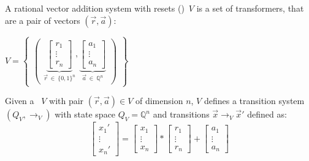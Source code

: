 \begin{frame}[t]
	\frametitle{\qvasr}
	\begin{definition}[\qvasr]
		A rational vector addition system with resets (\qvasr)\ $V$ is a set of transformers, that are a pair of vectors $(\vec{r}, \vec{a})$:\\
		\begin{center}
			$ V = 
			\begin{Bmatrix}
				\begin{pmatrix}
					\underbrace{
						\begin{bmatrix}
							r_1 \\
							\vdots \\
							r_n
					\end{bmatrix}}_{\vec{r}\ \in\ \{0,1\}^n},
					\underbrace{
						\begin{bmatrix}
							a_1 \\
							\vdots \\
							a_n
					\end{bmatrix}}_{\vec{a}\ \in\ \mathbb{Q}^n}
				\end{pmatrix}
			\end{Bmatrix}
			$
		\end{center}
	\end{definition}
	\begin{center}
		Given a \qvasr\ $V$ with pair $(\vec{r}, \vec{a}) \in V$ of dimension $n$, $V$ defines a transition system $(Q_V, \rightarrow_V)$ with state space $Q_V =  \mathbb{Q}^n$  and transitions $\vec{x} \rightarrow_V \vec{x}'$ defined as: \\
			\begin{equation*}
				\begin{bmatrix}
					x_1' \\
					\vdots \\
					x_n'
				\end{bmatrix}
				=
				\begin{bmatrix}
					x_1 \\
					\vdots \\
					x_n
				\end{bmatrix}
				*
				\begin{bmatrix}
					r_1 \\
					\vdots \\
					r_n
				\end{bmatrix}
				+
				\begin{bmatrix}
					a_1 \\
					\vdots \\
					a_n
				\end{bmatrix}		
			\end{equation*}
		\end{center}
\end{frame}